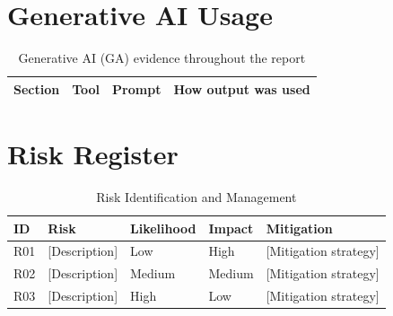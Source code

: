 \documentclass[12pt, a4paper]{report}
\renewcommand{\chaptername}{}
\begin{document}
\begin{appendices}
\renewcommand{\chaptername}{Appendix}

\chapter{Generative AI Usage}
\label{app:ai-usage}

\begin{table}[H]
    \centering
    \caption{Generative AI (GA) evidence throughout the report}
    \label{tab:ga-evidence}
    \begin{tabular}{@{} l l l p{5cm} @{}}
        \toprule
        \textbf{Section} & \textbf{Tool} & \textbf{Prompt} & \textbf{How output was used} \\
        \midrule
        \bottomrule
    \end{tabular}
\end{table}

\chapter{Risk Register}
\label{app:risk}

\begin{table}[H]
    \centering
    \caption{Risk Identification and Management}
    \label{tab:risk-register}
    \begin{tabular}{@{} l p{3cm} l l p{3.5cm} @{}}
        \toprule
        \textbf{ID} & \textbf{Risk} & \textbf{Likelihood} & \textbf{Impact} & \textbf{Mitigation} \\
        \midrule
        R01 & [Description] & Low   & High   & [Mitigation strategy] \\
        R02 & [Description] & Medium & Medium & [Mitigation strategy] \\
        R03 & [Description] & High  & Low    & [Mitigation strategy] \\
        \bottomrule
    \end{tabular}
\end{table}


\end{appendices}
\end{document}
